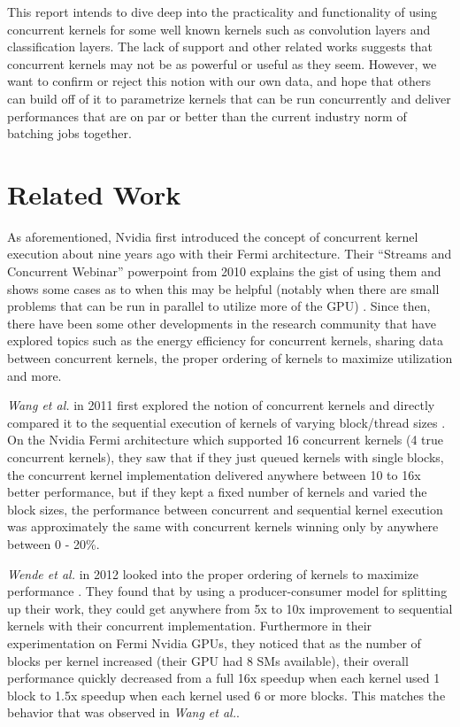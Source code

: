 \documentclass[sigconf]{acmart}
\begin{document}
This report intends to dive deep into the practicality and functionality of using concurrent kernels for some well known kernels such as convolution layers and classification layers. The lack of support and other related works suggests that concurrent kernels may not be as powerful or useful as they seem. However, we want to confirm or reject this notion with our own data, and hope that others can build off of it to parametrize kernels that can be run concurrently and deliver performances that are on par or better than the current industry norm of batching jobs together.  


\section{Related Work}
As aforementioned, Nvidia first introduced the concept of concurrent kernel execution about nine years ago with their Fermi architecture. Their “Streams and Concurrent Webinar” powerpoint from 2010 explains the gist of using them and shows some cases as to when this may be helpful (notably when there are small problems that can be run in parallel to utilize more of the GPU) \cite{nvidia_concurrent}. Since then, there have been some other developments in the research community that have explored topics such as the energy efficiency for concurrent kernels, sharing data between concurrent kernels, the proper ordering of kernels to maximize utilization and more. 

\textit{Wang et al.} in 2011 first explored the notion of concurrent kernels and directly compared it to the sequential execution of kernels of varying block/thread sizes \cite{wang_huang_el_ghazawi_2011}. On the Nvidia Fermi architecture which supported 16 concurrent kernels (4 true concurrent kernels), they saw that if they just queued kernels with single blocks, the concurrent kernel implementation delivered anywhere between 10 to 16x better performance, but if they kept a fixed number of kernels and varied the block sizes, the performance between concurrent and sequential kernel execution was approximately the same with concurrent kernels winning only by anywhere between 0 - 20\%.

\textit{Wende et al.} in 2012 looked into the proper ordering of kernels to maximize performance \cite{wende_cordes_steinke_2012}. They found that by using a producer-consumer model for splitting up their work, they could get anywhere from 5x to 10x improvement to sequential kernels with their concurrent implementation. Furthermore in their experimentation on Fermi Nvidia GPUs, they noticed that as the number of blocks per kernel increased (their GPU had 8 SMs available), their overall performance quickly decreased from a full 16x speedup when each kernel used 1 block to 1.5x speedup when each kernel used 6 or more blocks. This matches the behavior that was observed in \textit{Wang et al.}.
\end{document}
